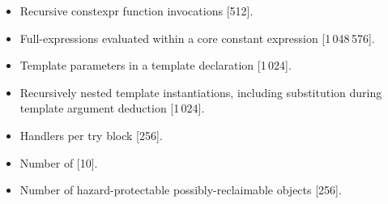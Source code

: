 \begin{itemize}
\item%
Recursive constexpr function invocations [512].
\item%
Full-expressions evaluated within a core constant expression [1\,048\,576].
\item%
Template parameters in a template declaration [1\,024].
\item%
Recursively nested template instantiations, including substitution
during template argument deduction [1\,024].
\item%
Handlers per try block [256].
\item%
Number of  [10].
\item%
Number of hazard-protectable possibly-reclaimable objects [256].
\end{itemize}
